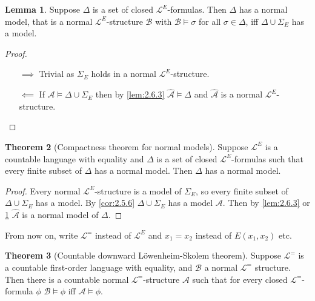 \documentclass{article}
\newcommand{\rb}[1]{\left( #1 \right)}
\theoremstyle{definition}\newtheorem{definition}{Definition}[subsection]
\theoremstyle{definition}\newtheorem{remark}[definition]{Remark}
\theoremstyle{definition}\newtheorem*{example}{Example}
\theoremstyle{definition}\newtheorem*{note}{Note}
\newtheorem{lemma}[definition]{Lemma}
\newtheorem{theorem}[definition]{Theorem}
\begin{document}
\begin{lemma}
\label{lem:2.6.4}
Suppose $ \Delta $ is a set of closed $ \mathcal{L}^E $-formulas. Then $ \Delta $ has a normal model, that is a normal $ \mathcal{L}^E $-structure $ \mathcal{B} $ with $ \mathcal{B} \vDash \sigma $ for all $ \sigma \in \Delta $, iff $ \Delta \cup \Sigma_E $ has a model.
\end{lemma}

\begin{proof}
\hfill
\begin{itemize}
\item[$ \implies $] Trivial as $ \Sigma_E $ holds in a normal $ \mathcal{L}^E $-structure.
\item[$ \impliedby $] If $ \mathcal{A} \vDash \Delta \cup \Sigma_E $ then by \ref{lem:2.6.3} $ \widehat{\mathcal{A}} \vDash \Delta $ and $ \widehat{\mathcal{A}} $ is a normal $ \mathcal{L}^E $-structure.
\end{itemize}
\end{proof}

\begin{theorem}[Compactness theorem for normal models]
Suppose $ \mathcal{L}^E $ is a countable language with equality and $ \Delta $ is a set of closed $ \mathcal{L}^E $-formulas such that every finite subset of $ \Delta $ has a normal model. Then $ \Delta $ has a normal model.
\end{theorem}

\begin{proof}
Every normal $ \mathcal{L}^E $-structure is a model of $ \Sigma_E $, so every finite subset of $ \Delta \cup \Sigma_E $ has a model. By \ref{cor:2.5.6} $ \Delta \cup \Sigma_E $ has a model $ \mathcal{A} $. Then by \ref{lem:2.6.3} or \ref{lem:2.6.4} $ \widehat{\mathcal{A}} $ is a normal model of $ \Delta $.
\end{proof}

From now on, write $ \mathcal{L}^= $ instead of $ \mathcal{L}^E $ and $ x_1 = x_2 $ instead of $ E\rb{x_1, x_2} $ etc.


\begin{theorem}[Countable downward Löwenheim-Skolem theorem]
Suppose $ \mathcal{L}^= $ is a countable first-order language with equality, and $ \mathcal{B} $ a normal $ \mathcal{L}^= $ structure. Then there is a countable normal $ \mathcal{L}^= $-structure $ \mathcal{A} $ such that for every closed $ \mathcal{L}^= $-formula $ \phi $ $ \mathcal{B} \vDash \phi $ iff $ \mathcal{A} \vDash \phi $.
\end{theorem}
\end{document}
